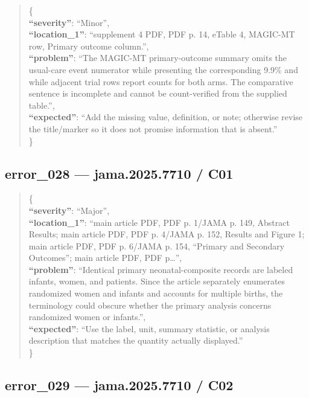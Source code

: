 \documentclass[
  letterpaper,
  9pt]{extreport}
\begin{document}
\begin{quote}
\{\\
\textbf{``severity''}: ``Minor'',\\
\textbf{``location\_1''}: ``supplement 4 PDF, PDF p. 14, eTable 4,
MAGIC-MT row, Primary outcome column.'',\\
\textbf{``problem''}: ``The MAGIC-MT primary-outcome summary omits the
usual-care event numerator while presenting the corresponding 9.9\% and
while adjacent trial rows report counts for both arms. The comparative
sentence is incomplete and cannot be count-verified from the supplied
table.'',\\
\textbf{``expected''}: ``Add the missing value, definition, or note;
otherwise revise the title/marker so it does not promise information
that is absent.''\\
\}
\end{quote}

\hypertarget{error_028--jama20257710--c01}{%
\subsection{error\_028 --- jama.2025.7710 /
C01}\label{error_028--jama20257710--c01}}

\begin{quote}
\{\\
\textbf{``severity''}: ``Major'',\\
\textbf{``location\_1''}: ``main article PDF, PDF p. 1/JAMA p. 149,
Abstract Results; main article PDF, PDF p. 4/JAMA p. 152, Results and
Figure 1; main article PDF, PDF p. 6/JAMA p. 154, ``Primary and
Secondary Outcomes''; main article PDF, PDF p\ldots{}'',\\
\textbf{``problem''}: ``Identical primary neonatal-composite records are
labeled infants, women, and patients. Since the article separately
enumerates randomized women and infants and accounts for multiple
births, the terminology could obscure whether the primary analysis
concerns randomized women or infants.'',\\
\textbf{``expected''}: ``Use the label, unit, summary statistic, or
analysis description that matches the quantity actually displayed.''\\
\}
\end{quote}

\hypertarget{error_029--jama20257710--c02}{%
\subsection{error\_029 --- jama.2025.7710 /
C02}\label{error_029--jama20257710--c02}}
\end{document}
